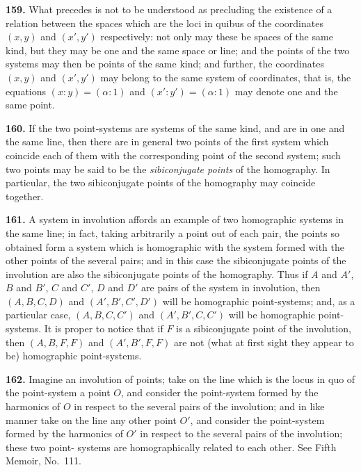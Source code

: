 \documentclass[11pt,a4paper]{article}
\begin{document}
\textbf{159.} What precedes is not to be understood as precluding the existence of a
relation between the spaces which are the loci in quibus of the coordinates $(x,y)$ and
$(x',y')$ respectively: not only may these be spaces of the same kind, but they may
be one and the same space or line; and the points of the two systems may then be
points of the same kind; and further, the coordinates $(x,y)$ and $(x',y')$ may belong to
the same system of coordinates, that is, the equations $(x:y)=(\alpha:1)$ and
$(x':y')=(\alpha:1)$ may denote one and the same point.

\textbf{160.} If the two point-systems are systems of the same kind, and are in one
and the same line, then there are in general two points of the first system which
coincide each of them with the corresponding point of the second system; such two
points may be said to be the \textit{sibiconjugate points} of the homography. In particular,
the two sibiconjugate points of the homography may coincide together.

\textbf{161.} A system in involution affords an example of two homographic systems in
the same line; in fact, taking arbitrarily a point out of each pair, the points so
obtained form a system which is homographic with the system formed with the other
points of the several pairs; and in this case the sibiconjugate points of the involution
are also the sibiconjugate points of the homography. Thus if $A$ and $A'$, $B$ and $B'$,
$C$ and $C'$, $D$ and $D'$ are pairs of the system in involution, then $(A,B,C,D)$ and
$(A',B',C',D')$ will be homographic point-systems; and, as a particular case,
$(A,B,C,C')$ and $(A',B',C,C')$ will be homographic point-systems. It is proper
to notice that if $F$ is a sibiconjugate point of the involution, then $(A,B,F,F)$ and
$(A',B',F,F)$ are not (what at first sight they appear to be) homographic point-systems.

\textbf{162.} Imagine an involution of points; take on the line which is the locus in
quo of the point-system a point $O$, and consider the point-system formed by the
harmonics of $O$ in respect to the several pairs of the involution; and in like manner
take on the line any other point $O'$, and consider the point-system formed by the
harmonics of $O'$ in respect to the several pairs of the involution; these two point-
systems are homographically related to each other. See Fifth Memoir, No.~111.
\end{document}
